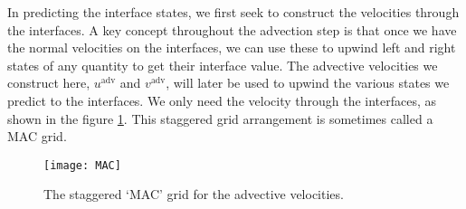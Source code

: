 In predicting the interface states, we first seek to construct the
velocities through the interfaces.  A key concept throughout the
advection step is that once we have the normal velocities on the
interfaces, we can use these to upwind left and right states of any
quantity to get their interface value.  The advective velocities we
construct here, ${u}^\mathrm{adv}$ and ${v}^\mathrm{adv}$,
will later be used to upwind the various states we predict to the
interfaces.  We only need the velocity through the interfaces, as
shown in the figure \ref{fig:MAC}. This staggered grid arrangement is
sometimes called a MAC grid.

\begin{figure}[h]
\centering
\texttt{[image: MAC]}
\caption[MAC grid for velocity]
  {\label{fig:MAC} The staggered `MAC' grid for the advective
  velocities.}
\end{figure}


